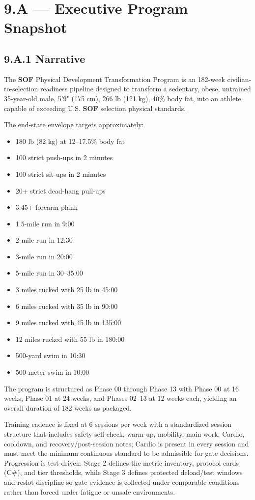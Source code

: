 \documentclass[10pt]{article}
\begin{document}
\section*{9.A — Executive Program Snapshot}
{}

\subsection*{9.A.1 Narrative}
{}

The \textbf{SOF} Physical Development Transformation Program is an 182-week civilian-to-selection readiness pipeline designed to transform a sedentary, obese, untrained 35-year-old male, 5'9" (175 cm), 266 lb (121 kg), 40\% body fat, into an athlete capable of exceeding U.S. \textbf{SOF} selection physical standards.

The end-state envelope targets approximately:

\begin{itemize}
\item 180 lb (82 kg) at 12–17.5\% body fat
\item 100 strict push-ups in 2 minutes
\item 100 strict sit-ups in 2 minutes
\item 20+ strict dead-hang pull-ups
\item 3:45+ forearm plank
\item 1.5-mile run in 9:00
\item 2-mile run in 12:30
\item 3-mile run in 20:00
\item 5-mile run in 30–35:00
\item 3 miles rucked with 25 lb in 45:00
\item 6 miles rucked with 35 lb in 90:00
\item 9 miles rucked with 45 lb in 135:00
\item 12 miles rucked with 55 lb in 180:00
\item 500-yard swim in 10:30
\item 500-meter swim in 10:00
\end{itemize}

The program is structured as Phase 00 through Phase 13 with Phase 00 at 16 weeks, Phase 01 at 24 weeks, and Phases 02–13 at 12 weeks each, yielding an overall duration of 182 weeks as packaged.

Training cadence is fixed at 6 sessions per week with a standardized session structure that includes safety self-check, warm-up, mobility, main work, Cardio, cooldown, and recovery/post-session notes; Cardio is present in every session and must meet the minimum continuous standard to be admissible for gate decisions. Progression is test-driven: Stage 2 defines the metric inventory, protocol cards (C\#), and tier thresholds, while Stage 3 defines protected deload/test windows and reslot discipline so gate evidence is collected under comparable conditions rather than forced under fatigue or unsafe environments.
\end{document}
